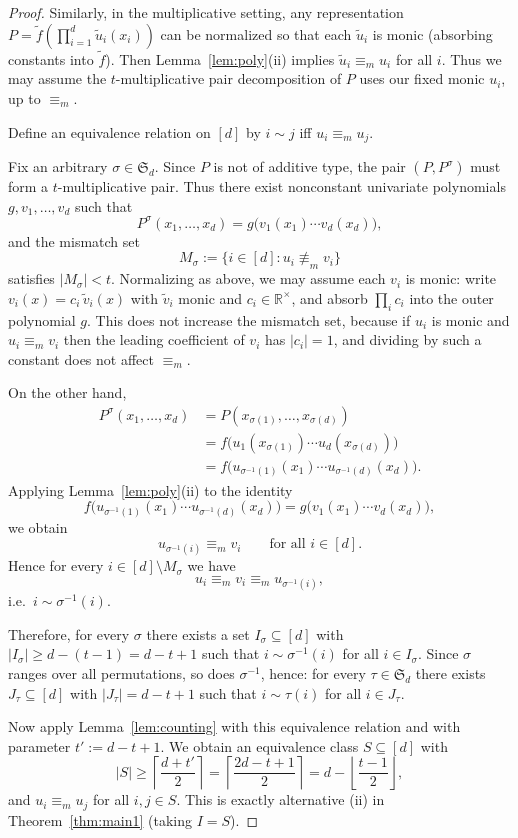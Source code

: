 \documentclass[12pt,reqno]{amsart}
\numberwithin{equation}{section}
\begin{document}
\begin{proof}
Similarly, in the multiplicative setting, any representation $P=\widetilde f(\prod_{i=1}^d \widetilde u_i(x_i))$
can be normalized so that each $\widetilde u_i$ is monic (absorbing constants into $\widetilde f$).
Then Lemma~\ref{lem:poly}(ii) implies $\widetilde u_i\equiv_m u_i$ for all $i$.
Thus we may assume the $t$-multiplicative pair decomposition of $P$ uses our fixed monic $u_i$, up to $\equiv_m$.



Define an equivalence relation on $[d]$ by $i\sim j$ iff $u_i\equiv_m u_j$.

Fix an arbitrary $\sigma\in\mathfrak S_d$.
Since $P$ is not of additive type, the pair $(P,P^\sigma)$ must form a $t$-multiplicative pair.
Thus there exist nonconstant univariate polynomials $g,v_1,\ldots,v_d$ such that
\[
P^{\sigma}(x_1,\ldots,x_d)=g\big(v_1(x_1)\cdots v_d(x_d)\big),
\]
and the mismatch set
\[
M_{\sigma}:=\{i\in[d]: u_i\not\equiv_m v_i\}
\]
satisfies $|M_\sigma|<t$.
Normalizing as above, we may assume each $v_i$ is monic: write $v_i(x)=c_i\,\widetilde v_i(x)$ with $\widetilde v_i$ monic and $c_i\in\mathbb R^\times$, and absorb $\prod_i c_i$ into the outer polynomial $g$.
This does not increase the mismatch set, because if $u_i$ is monic and $u_i\equiv_m v_i$ then the leading coefficient of $v_i$ has $|c_i|=1$, and dividing by such a constant does not affect $\equiv_m$.


On the other hand,
\begin{align*}
P^{\sigma}(x_1,\ldots,x_d)
&=P(x_{\sigma(1)},\ldots,x_{\sigma(d)})\\
&=f\big(u_1(x_{\sigma(1)})\cdots u_d(x_{\sigma(d)})\big)\\
&=f\big(u_{\sigma^{-1}(1)}(x_1)\cdots u_{\sigma^{-1}(d)}(x_d)\big).
\end{align*}
Applying Lemma~\ref{lem:poly}(ii) to the identity
\[
f\big(u_{\sigma^{-1}(1)}(x_1)\cdots u_{\sigma^{-1}(d)}(x_d)\big)
=
g\big(v_1(x_1)\cdots v_d(x_d)\big),
\]
we obtain
\[
u_{\sigma^{-1}(i)}\equiv_m v_i \qquad \text{for all } i\in[d].
\]
Hence for every $i\in[d]\setminus M_\sigma$ we have
\[
u_i\equiv_m v_i\equiv_m u_{\sigma^{-1}(i)},
\]
i.e.\ $i\sim \sigma^{-1}(i)$.

Therefore, for every $\sigma$ there exists a set $I_\sigma\subseteq[d]$ with
$|I_\sigma|\ge d-(t-1)=d-t+1$ such that $i\sim \sigma^{-1}(i)$ for all $i\in I_\sigma$.
Since $\sigma$ ranges over all permutations, so does $\sigma^{-1}$, hence:
for every $\tau\in\mathfrak S_d$ there exists $J_\tau\subseteq[d]$ with $|J_\tau|=d-t+1$ such that
$i\sim \tau(i)$ for all $i\in J_\tau$.

Now apply Lemma~\ref{lem:counting} with this equivalence relation and with parameter $t':=d-t+1$.
We obtain an equivalence class $S\subseteq[d]$ with
\[
|S|\ge \left\lceil \frac{d+t'}2\right\rceil
=\left\lceil \frac{2d-t+1}{2}\right\rceil
=d-\left\lfloor \frac{t-1}{2}\right\rfloor,
\]
and $u_i\equiv_m u_j$ for all $i,j\in S$.
This is exactly alternative (ii) in Theorem~\ref{thm:main1} (taking $I=S$).

\end{proof}
\end{document}
